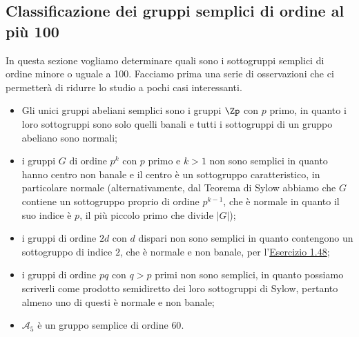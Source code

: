 \documentclass[11pt]{scrartcl}
\begin{document}
	\newpage
	
	\subsection{Classificazione dei gruppi semplici di ordine al più 100}
	
	In questa sezione vogliamo determinare quali sono i sottogruppi semplici di 
	ordine minore o uguale a 100. Facciamo prima una serie di osservazioni che 
	ci permetterà di ridurre lo studio a pochi casi interessanti.
	
	\begin{itemize}
		\item Gli unici gruppi abeliani semplici sono i gruppi $\Zp$ con $p$ primo,
		in quanto i loro sottogruppi sono solo quelli banali e tutti i sottogruppi
		di un gruppo abeliano sono normali;
		\item i gruppi $G$ di ordine $p^k$ con $p$ primo e $k > 1$ non sono semplici
		in quanto hanno centro non banale e il centro è un sottogruppo caratteristico,
		in particolare normale (alternativamente, dal Teorema di Sylow abbiamo che 
		$G$ contiene un sottogruppo proprio di ordine $p^{k - 1}$, che è normale in quanto
		il suo indice è $p$, il più piccolo primo che divide $|G|$);
		\item i gruppi di ordine $2d$ con $d$ dispari non sono semplici in quanto
		contengono un sottogruppo di indice $2$, che è normale e non banale, per 
		l'\hyperref[ex1.48]{Esercizio 1.48};
		\item i gruppi di ordine $pq$ con $q > p$ primi non sono semplici, in
		quanto possiamo scriverli come prodotto semidiretto dei loro sottogruppi
		di Sylow, pertanto almeno uno di questi è normale e non banale;
		\item $\mathcal{A}_5$ è un gruppo semplice di ordine $60$.
	\end{itemize}
	
\end{document}

